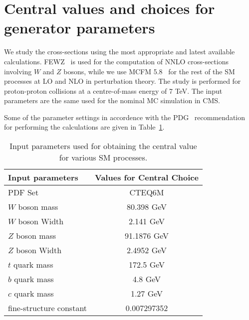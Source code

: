 \section{Central values and choices for generator parameters}
\label{sec:assumptions}
We study the cross-sections using the most appropriate and latest available 
calculations. FEWZ~\cite{fewz} is used for the computation of NNLO 
cross-sections involving $W$ and $Z$ bosons, while we use 
MCFM 5.8~\cite{mcfm} for the rest of the SM processes at LO and NLO in 
perturbation theory. The study is performed for proton-proton collisions at 
a centre-of-mass energy of 7 TeV. The input parameters are the same used for 
the nominal MC simulation in CMS.

Some of the parameter settings in accordence with the PDG~\cite{pdg} 
recommendation for performing the calculations are given in 
Table~\ref{tab:input_params}.

\vspace{0.9mm}
\begin{table}[hbt]
\begin{center}
\renewcommand{\arraystretch}{1.2}
\begin{tabular}{|l|c|}\hline
Input parameters & Values for Central Choice \\ \hline
PDF Set & CTEQ6M \\ \hline
$W$ boson mass & 80.398 GeV \\ \hline	
$W$ boson Width & 2.141 GeV \\ \hline	
$Z$ boson mass & 91.1876 GeV \\ \hline	
$Z$ boson Width & 2.4952 GeV \\ \hline	
$t$ quark mass & 172.5 GeV \\ \hline	
$b$ quark mass & 4.8 GeV \\ \hline	
$c$ quark mass & 1.27 GeV \\ \hline	
fine-structure constant &  0.007297352 \\ \hline	
\end{tabular} 
\caption{Input parameters used for obtaining the central value for various 
SM processes.\label{tab:input_params}}
\end{center}
\end{table}
